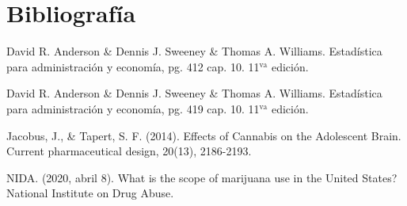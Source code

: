 \documentclass[a4paper]{report}
\begin{document}
\section*{Bibliografía}
\begin{enumerate}[label={[\arabic*]}]
    \item David R. Anderson \& Dennis J. Sweeney \& Thomas A. Williams. Estadística para administración y economía, pg. 412 cap. 10. 11$^{\text{va}}$ edición.
    \item David R. Anderson \& Dennis J. Sweeney \& Thomas A. Williams. Estadística para administración y economía, pg. 419 cap. 10. 11$^{\text{va}}$ edición.
    \item Jacobus, J., \& Tapert, S. F. (2014). Effects of Cannabis on the Adolescent Brain. Current pharmaceutical design, 20(13), 2186-2193.
    \item NIDA. (2020, abril 8). What is the scope of marijuana use in the United States? National Institute on Drug Abuse. 
\end{enumerate}
\end{document}
